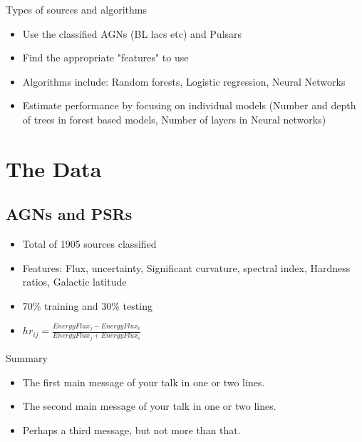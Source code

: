\documentclass{beamer}
\begin{document}
\begin{frame}{Types of sources and algorithms}
 \begin{itemize}
  \item
Use the classified AGNs (BL lacs etc) and Pulsars
  \item
	Find the appropriate "features" to use
  \item
Algorithms include: Random forests, Logistic regression, Neural Networks
  \item
	Estimate performance by focusing on individual models (Number and depth of trees in forest based models, Number of layers in Neural networks)
\end{itemize}
\end{frame}


\section{The Data}

\subsection{AGNs and PSRs}

\begin{frame}{}
\begin{itemize}
 \item
Total of 1905 sources classified
 \item
Features: Flux, uncertainty, Significant curvature, spectral index, Hardness ratios,  Galactic latitude
 \item
70\% training and 30\% testing 
 \item
$hr_{ij}=\frac{EnergyFlux_j - EnergyFlux_i}{EnergyFlux_j + EnergyFlux_i}$
\end{itemize} 

\end{frame}

\begin{frame}{Summary}

  \begin{itemize}
  \item
    The \alert{first main message} of your talk in one or two lines.
  \item
    The \alert{second main message} of your talk in one or two lines.
  \item
    Perhaps a \alert{third message}, but not more than that.
  \end{itemize}
  
\end{frame}
\end{document}
